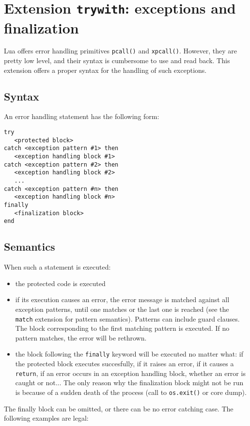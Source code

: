 \section{Extension {\tt trywith}: exceptions and finalization}
Lua offers error handling primitives \verb+pcall()+ and
\verb+xpcall()+. However, they are pretty low level, and their syntax
is cumbersome to use and read back. This extension offers a proper
syntax for the handling of such exceptions.

\subsection{Syntax}
An error handling statement has the following form:

\begin{verbatim}
try
   <protected block>
catch <exception pattern #1> then
   <exception handling block #1>
catch <exception pattern #2> then
   <exception handling block #2>
   ...
catch <exception pattern #n> then
   <exception handling block #n>
finally
   <finalization block>
end
\end{verbatim}

\subsection{Semantics}
When such a statement is executed:
\begin{itemize}
\item the protected code is executed
\item if its execution causes an error, the error message is matched
  against all exception patterns, until one matches or the last one is
  reached (see the \verb+match+ extension for pattern
  semantics). Patterns can include guard clauses. The block
  corresponding to the first matching pattern is executed. If no
  pattern matches, the error will be rethrown.
\item the block following the \verb+finally+ keyword will be executed
  no matter what: if the protected block executes succesfully, if it
  raises an error, if it causes a \verb+return+, if an error occurs in
  an exception handling block, whether an error is caught or
  not... The only reason why the finalization block might not be run
  is because of a sudden death of the process (call to {\tt os.exit()}
  or core dump).
\end{itemize}

The finally block can be omitted, or there can be no error catching
case. The following examples are legal:

